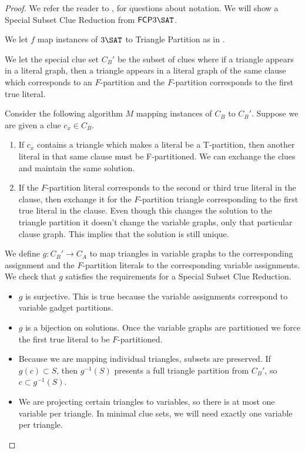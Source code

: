 \documentclass[runningheads,a4paper]{llncs}
\begin{document}
\begin{proof}
We refer the reader to \cite{holyer1981np}, \cite{colbourn1984complexity} for questions about notation. We will show a Special Subset Clue Reduction from $\mathsf{FCP} 3\SAT$. 

We let $f$ map instances of $3\SAT$ to Triangle Partition as in \cite{holyer1981np}.

We let the special clue set $C_B'$ be the subset of clues where if a triangle appears in a literal graph, then a triangle appears in a literal graph of the same clause which corresponds to an $F$-partition and the $F$-partition corresponds to the first true literal.

Consider the following algorithm $M$ mapping instances of $C_B$ to $C_B'$. Suppose we are given a clue $c_x \in C_B$. 
\begin{enumerate}
\item  If $c_x$ contains a triangle which makes a literal be a T-partition, then another literal in that same clause must be F-partitioned. We can exchange the clues and maintain the same solution.
\item If the $F$-partition literal corresponds to the second or third true literal in the clause, then exchange it for the $F$-partition triangle corresponding to the first true literal in the clause. Even though this changes the solution to the triangle partition it doesn't change the variable graphs, only that particular clause graph. This implies that the solution is still unique.
\end{enumerate}

We define $g: C_B' \rightarrow C_A$ to map triangles in variable graphs to the corresponding assignment and the $F$-partition literals to the corresponding variable assignments. We check that $g$ satisfies the requirements for a Special Subset Clue Reduction.
\begin{itemize}
\item $g$ is surjective. This is true because the variable assignments correspond to variable gadget partitions.
\item $g$ is a bijection on solutions. Once the variable graphs are partitioned we force the first true literal to be $F$-partitioned. 
\item Because we are mapping individual triangles, subsets are preserved. If $g(c) \subset S$, then $g^{-1}(S)$ presents a full triangle partition from $C_B'$, so $c \subset g^{-1}(S)$. 
\item We are projecting certain triangles to variables, so there is at most one variable per triangle. In minimal clue sets, we will need exactly one variable per triangle.
\end{itemize}
\end{proof}
\end{document}

